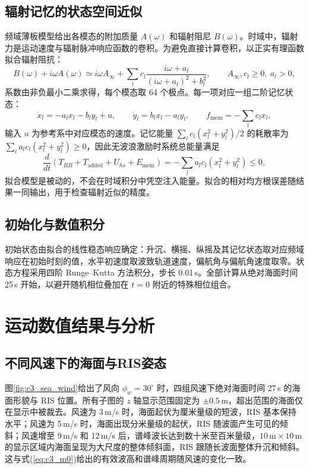 \subsection{辐射记忆的状态空间近似}

频域薄板模型给出各模态的附加质量 $A(\omega)$ 和辐射阻尼 $B(\omega)$。时域中，辐射力是运动速度与辐射脉冲响应函数的卷积。为避免直接计算卷积，以正实有理函数拟合辐射阻抗：
\begin{equation}
B(\omega)+i\omega A(\omega)\simeq i\omega A_\infty+\sum_lc_l\frac{i\omega+a_l}{(i\omega+a_l)^2+b_l^2},\qquad A_\infty,c_l\ge0,\ a_l>0,
\label{eq:c3_fit}
\end{equation}
系数由非负最小二乘求得，每个模态取 64 个极点。每一项对应一组二阶记忆状态：
\begin{equation}
\dot x_l=-a_lx_l-b_ly_l+u,\qquad \dot y_l=b_lx_l-a_ly_l,\qquad f_{\mathrm{mem}}=-\sum_lc_lx_l,
\label{eq:c3_memory}
\end{equation}
输入 $u$ 为参考系中对应模态的速度。记忆能量 $\sum_lc_l(x_l^2+y_l^2)/2$ 的耗散率为 $\sum_la_lc_l(x_l^2+y_l^2)\ge0$，因此无波浪激励时系统总能量满足
\begin{equation}
\frac{d}{dt}\left(T_{RB}+T_{\mathrm{added}}+U_{hs}+E_{\mathrm{mem}}\right)=-\sum_la_lc_l(x_l^2+y_l^2)\le0,
\label{eq:c3_energy}
\end{equation}
拟合模型是被动的，不会在时域积分中凭空注入能量。拟合的相对均方根误差随结果一同输出，用于检查辐射近似的精度。

\subsection{初始化与数值积分}

初始状态由拟合的线性稳态响应确定：升沉、横摇、纵摇及其记忆状态取对应频域响应在初始时刻的值，水平初速度取波致轨道速度，偏航角与偏航角速度取零。状态方程采用四阶 Runge--Kutta 方法积分，步长 0.01\,s。全部计算从绝对海面时间 25\,s 开始，以避开随机相位叠加在 $t=0$ 附近的特殊相位组合。

\section{运动数值结果与分析}
\label{sec:c3_results}

\subsection{不同风速下的海面与RIS姿态}

图\ref{fig:c3_sea_wind}给出了风向 $\phi_w=30^\circ$ 时，四组风速下绝对海面时间 27\,s 的海面形貌与 RIS 位置。所有子图的 $z$ 轴显示范围固定为 $\pm0.5\,\mathrm{m}$，超出范围的海面仅在显示中被裁去。风速为 3\,m/s 时，海面起伏为厘米量级的短波，RIS 基本保持水平；风速为 5\,m/s 时，海面出现分米量级的起伏，RIS 随波面产生可见的倾斜；风速增至 9\,m/s 和 12\,m/s 后，谱峰波长达到数十米至百米量级，$10\,\mathrm{m}\times10\,\mathrm{m}$ 的显示区域内海面呈现为大尺度的整体倾斜面，RIS 跟随长波面整体升沉和倾斜。这与式(\ref{eq:c3_m0})给出的有效波高和谱峰周期随风速的变化一致。


